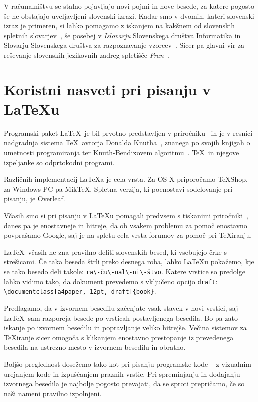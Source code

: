 \documentclass[a4paper,12pt,openright]{book}
\begin{document}
V računalništvu se stalno pojavljajo novi pojmi in nove besede, za katere pogosto še ne obstajajo uveljavljeni slovenski izrazi.
Kadar smo v dvomih, kateri slovenski izraz je primeren, si lahko pomagamo z iskanjem na kakšnem od slovenskih spletnih slovarjev~\cite{slovarji}, še posebej v
\textit{Islovarju} Slovenskega društva Informatika \cite{Islovar} in Slovarju Slovenskega društva za razpoznavanje vzorcev~\cite{sdrv}.
Sicer pa glavni vir za reševanje slovenskih jezikovnih zadreg spletišče \textit{Fran}~\cite{fran}.


\chapter{Koristni nasveti pri pisanju v \LaTeX{u}}
\label{latex}

Programski paket \LaTeX\ je bil prvotno predstavljen v priročniku~\cite{lamport} in je v resnici nadgradnja sistema \TeX\ avtorja Donalda Knutha~\cite{knuth}, 
znanega po svojih knjigah o umetnosti programiranja
ter Knuth-Bendixovem algoritmu~\cite{knuth1983simple}.
\TeX\ in njegove izpeljanke so odprtokodni programi.

Različnih implementacij \LaTeX{}a je cela vrsta.
Za OS X priporočamo TeXShop, za Windows PC pa MikTeX.
Spletna verzija, ki poenostavi sodelovanje pri pisanju, je Overleaf.

Včasih smo si pri pisanju v \LaTeX{}u  pomagali predvsem s tiskanimi pri\-ro\-čni\-ki~\cite{lamport}, danes pa je enostavneje in hitreje, da ob vsakem problemu za pomoč enostavno povprašamo Google, 
saj je na spletu cela vrsta forumov za pomoč pri \TeX iranju.

\LaTeX\ včasih ne zna pravilno deliti slovenskih besed, ki vsebujejo črke s streši\-ca\-mi. 
Če taka beseda štrli preko desnega roba,  lahko \LaTeX{}u pokažemo, kje se tako besedo deli takole: \verb=ra\-ču\-nal\-ni\-štvo=.
Katere vrstice so predolge lahko vidimo tako, da dokument prevedemo s vključeno opcijo \texttt{draft}: \verb=\documentclass[a4paper, 12pt, draft]{book}=.

Predlagamo, da v izvornem besedilu začenjate vsak stavek v novi vrstici, saj \LaTeX\ sam razporeja besede po vrsticah postavljenega besedila. 
Bo pa zato iskanje po izvornem besedilu in popravljanje veliko hitrejše. 
Večina sistemov za \TeX{}iranje sicer omogoča s klikanjem enostavno prestopanje  iz prevedenega besedila na ustrezno mesto v izvornem besedilu in obratno.

Boljšo preglednost dosežemo tako kot pri pisanju programske kode -- z vizualnim urejanjem kode in izpuščanjem praznih vrstic.
Pri spreminjanju in dodajanju izvornega besedila je najbolje pogosto prevajati, da se sproti prepričamo, če so naši nameni pravilno izpolnjeni.
\end{document}
